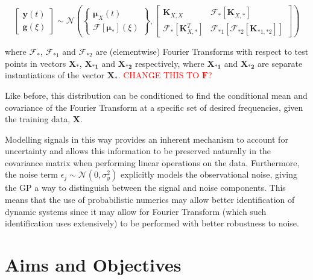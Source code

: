 \documentclass[12pt]{article}
\begin{document}
    \begin{equation}
        \left[
            \begin{array}{c}
                \mathbf{y}(t) \\
                \mathbf{g}(\xi)
            \end{array}
            \right]
        \sim \mathcal{N} \left(
        \left\{
        \begin{array}{c}
            \boldsymbol{\mu}_X(t) \\
            \mathcal{F}[{\boldsymbol{\mu}_*}](\xi)
        \end{array}
        \right\},
        \left[
            \begin{array}{cc}
                \mathbf{K}_{X,X} & \mathcal{F}_{*} [\boldsymbol{K}_{X,*}] \\
                \mathcal{F}_{*} [\boldsymbol{K}_{X,*}^T] & \mathcal{F}_{*1} [\mathcal{F}_{*2} [\boldsymbol{K}_{*1,*2}]]
            \end{array}
            \right]
        \right)\label{eq:linear-trans}
    \end{equation}

    \noindent where $\mathcal{F}_*$, $\mathcal{F}_{*1}$ and $\mathcal{F}_{*2}$ are (elementwise) Fourier Transforms with respect to test points in vectors $\mathbf{X_{*}}$, $\mathbf{X_{*1}}$ and $\mathbf{X_{*2}}$ respectively, where $\mathbf{X_{*1}}$ and $\mathbf{X_{*2}}$ are separate instantiations of the vector $\mathbf{X_{*}}$. \textcolor{red}{CHANGE THIS TO $\mathbf{F}$?}

    Like before, this distribution can be conditioned to find the conditional mean and covariance of the Fourier Transform at a specific set of desired frequencies, given the training data, $\mathbf{X}$.


    Modelling signals in this way provides an inherent mechanism to account for uncertainty and allows this information to be preserved naturally in the covariance matrix when performing linear operations on the data.
    Furthermore, the noise term  $\epsilon_j \sim \mathcal{N}(0, \sigma^2_y)$ explicitly models the observational noise, giving the GP a way to distinguish between the signal and noise components.
    This means that the use of probabilistic numerics may allow better identification of dynamic systems since it may allow for Fourier Transform  (which such identification uses extensively) to be performed with better robustness to noise.

    \section{Aims and Objectives}
\end{document}
